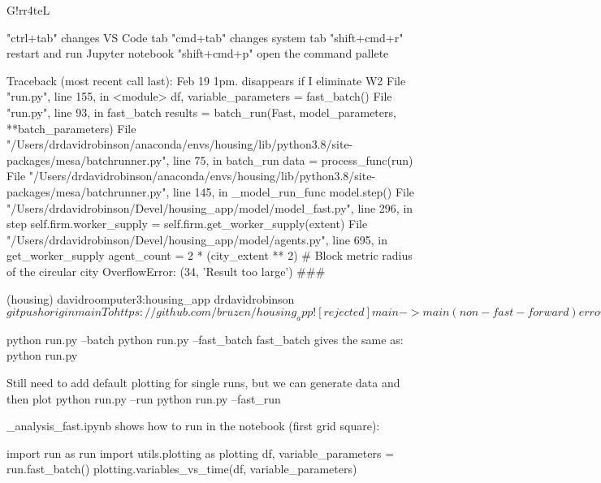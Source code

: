 

G!rr4teL

"ctrl+tab" changes VS Code tab
"cmd+tab"  changes system tab
"shift+cmd+r" restart and run Jupyter notebook
"shift+cmd+p" open the command pallete

Traceback (most recent call last): Feb 19 1pm. disappears if I eliminate W2
  File "run.py", line 155, in <module>
    df, variable_parameters = fast_batch()
  File "run.py", line 93, in fast_batch
    results = batch_run(Fast, model_parameters, **batch_parameters)
  File "/Users/drdavidrobinson/anaconda/envs/housing/lib/python3.8/site-packages/mesa/batchrunner.py", line 75, in batch_run
    data = process_func(run)
  File "/Users/drdavidrobinson/anaconda/envs/housing/lib/python3.8/site-packages/mesa/batchrunner.py", line 145, in _model_run_func
    model.step()
  File "/Users/drdavidrobinson/Devel/housing_app/model/model_fast.py", line 296, in step
    self.firm.worker_supply = self.firm.get_worker_supply(extent)
  File "/Users/drdavidrobinson/Devel/housing_app/model/agents.py", line 695, in get_worker_supply
    agent_count   = 2 * (city_extent ** 2)        #  Block metric radius of the circular city
OverflowError: (34, 'Result too large')
###

(housing) davidroomputer3:housing_app drdavidrobinson$ git push origin main
To https://github.com/bruzen/housing_app
 ! [rejected]        main -> main (non-fast-forward)
error: failed to push some refs to 'https://github.com/bruzen/housing_app'
hint: Updates were rejected because a pushed branch tip is behind its remote
hint: counterpart. Check out this branch and integrate the remote changes
hint: (e.g. 'git pull ...') before pushing again.
hint: See the 'Note about fast-forwards' in 'git push --help' for details.
(housing) davidroomputer3:housing_app drdavidrobinson$

python run.py --batch
python run.py --fast_batch
fast_batch gives the same as: python run.py

Still need to add default plotting for single runs, but we can generate data and then plot
python run.py --run
python run.py --fast_run


_analysis_fast.ipynb shows how to run in the notebook 
(first grid square):

import run as run
import utils.plotting as plotting
df, variable_parameters = run.fast_batch()
plotting.variables_vs_time(df, variable_parameters)




